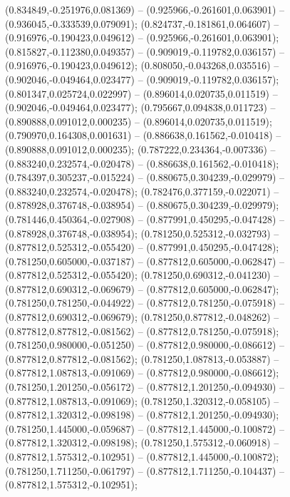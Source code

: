  (0.834849,-0.251976,0.081369) -- (0.925966,-0.261601,0.063901) -- (0.936045,-0.333539,0.079091);
 (0.824737,-0.181861,0.064607) -- (0.916976,-0.190423,0.049612) -- (0.925966,-0.261601,0.063901);
 (0.815827,-0.112380,0.049357) -- (0.909019,-0.119782,0.036157) -- (0.916976,-0.190423,0.049612);
 (0.808050,-0.043268,0.035516) -- (0.902046,-0.049464,0.023477) -- (0.909019,-0.119782,0.036157);
 (0.801347,0.025724,0.022997) -- (0.896014,0.020735,0.011519) -- (0.902046,-0.049464,0.023477);
 (0.795667,0.094838,0.011723) -- (0.890888,0.091012,0.000235) -- (0.896014,0.020735,0.011519);
 (0.790970,0.164308,0.001631) -- (0.886638,0.161562,-0.010418) -- (0.890888,0.091012,0.000235);
 (0.787222,0.234364,-0.007336) -- (0.883240,0.232574,-0.020478) -- (0.886638,0.161562,-0.010418);
 (0.784397,0.305237,-0.015224) -- (0.880675,0.304239,-0.029979) -- (0.883240,0.232574,-0.020478);
 (0.782476,0.377159,-0.022071) -- (0.878928,0.376748,-0.038954) -- (0.880675,0.304239,-0.029979);
 (0.781446,0.450364,-0.027908) -- (0.877991,0.450295,-0.047428) -- (0.878928,0.376748,-0.038954);
 (0.781250,0.525312,-0.032793) -- (0.877812,0.525312,-0.055420) -- (0.877991,0.450295,-0.047428);
 (0.781250,0.605000,-0.037187) -- (0.877812,0.605000,-0.062847) -- (0.877812,0.525312,-0.055420);
 (0.781250,0.690312,-0.041230) -- (0.877812,0.690312,-0.069679) -- (0.877812,0.605000,-0.062847);
 (0.781250,0.781250,-0.044922) -- (0.877812,0.781250,-0.075918) -- (0.877812,0.690312,-0.069679);
 (0.781250,0.877812,-0.048262) -- (0.877812,0.877812,-0.081562) -- (0.877812,0.781250,-0.075918);
 (0.781250,0.980000,-0.051250) -- (0.877812,0.980000,-0.086612) -- (0.877812,0.877812,-0.081562);
 (0.781250,1.087813,-0.053887) -- (0.877812,1.087813,-0.091069) -- (0.877812,0.980000,-0.086612);
 (0.781250,1.201250,-0.056172) -- (0.877812,1.201250,-0.094930) -- (0.877812,1.087813,-0.091069);
 (0.781250,1.320312,-0.058105) -- (0.877812,1.320312,-0.098198) -- (0.877812,1.201250,-0.094930);
 (0.781250,1.445000,-0.059687) -- (0.877812,1.445000,-0.100872) -- (0.877812,1.320312,-0.098198);
 (0.781250,1.575312,-0.060918) -- (0.877812,1.575312,-0.102951) -- (0.877812,1.445000,-0.100872);
 (0.781250,1.711250,-0.061797) -- (0.877812,1.711250,-0.104437) -- (0.877812,1.575312,-0.102951);
